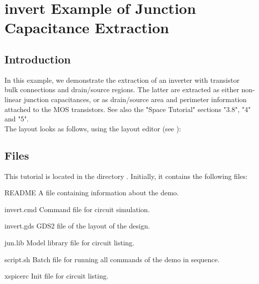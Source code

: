 \chapter{invert Example of Junction Capacitance Extraction}
\section{Introduction}
\label{PEintro}
In this example,
we demonstrate the extraction of an inverter with transistor bulk
connections and drain/source regions.
The latter are extracted as either non-linear junction capacitances,
or as drain/source area and perimeter information attached to the MOS transistors.
See also the "Space Tutorial" sections "3.8", "4" and "5".
\\[1 ex]
The layout looks as follows, using the layout editor  (see ):

\begin{figure}[h]
\centerline{}
\end{figure}

\section{Files}
This tutorial is located in the directory .
Initially, it contains the following files:
\begin{filelist}
\item[README] A file containing information about the demo.
\item[invert.cmd] Command file for circuit simulation.
\item[invert.gds] GDS2 file of the layout of the design.
\item[jun.lib] Model library file for circuit listing.
\item[script.sh] Batch file for running all commands of the demo in sequence.
\item[xspicerc] Init file for circuit listing.
\end{filelist}

